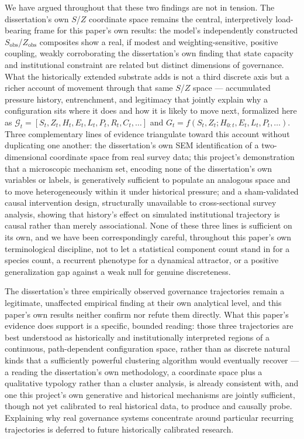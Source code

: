 We have argued throughout that these two findings are not in tension. The
dissertation's own $S$/$Z$ coordinate space remains the central,
interpretively load-bearing frame for this paper's own results: the
model's independently constructed $S_{\text{obs}}$/$Z_{\text{obs}}$
composites show a real, if modest and weighting-sensitive, positive
coupling, weakly corroborating the dissertation's own finding that state
capacity and institutional constraint are related but distinct dimensions
of governance. What the historically extended substrate adds is not a
third discrete axis but a richer account of movement through that same
$S$/$Z$ space --- accumulated pressure history, entrenchment, and
legitimacy that jointly explain why a configuration sits where it does and
how it is likely to move next, formalized here as
$\mathcal{G}_t=[S_t,Z_t,H_t,E_t,L_t,P_t,R_t,C_t,\ldots]$ and
$G_t=f(S_t,Z_t;H_{0:t},E_t,L_t,P_t,\ldots)$. Three complementary lines of
evidence triangulate toward this account without duplicating one another:
the dissertation's own SEM identification of a two-dimensional coordinate
space from real survey data; this project's demonstration that a
microscopic mechanism set, encoding none of the dissertation's own
variables or labels, is generatively sufficient to populate an analogous
space and to move heterogeneously within it under historical pressure; and
a sham-validated causal intervention design, structurally unavailable to
cross-sectional survey analysis, showing that history's effect on
simulated institutional trajectory is causal rather than merely
associational. None of these three lines is sufficient on its own, and we
have been correspondingly careful, throughout this paper's own
terminological discipline, not to let a statistical component count stand
in for a species count, a recurrent phenotype for a dynamical attractor,
or a positive generalization gap against a weak null for genuine
discreteness.

The dissertation's three empirically observed governance trajectories
remain a legitimate, unaffected empirical finding at their own analytical
level, and this paper's own results neither confirm nor refute them
directly. What this paper's evidence does support is a specific,
bounded reading: those three trajectories are best understood as
historically and institutionally interpreted regions of a continuous,
path-dependent configuration space, rather than as discrete natural kinds
that a sufficiently powerful clustering algorithm would eventually recover
--- a reading the dissertation's own methodology, a coordinate space plus a
qualitative typology rather than a cluster analysis, is already consistent
with, and one this project's own generative and historical mechanisms are
jointly sufficient, though not yet calibrated to real historical data, to
produce and causally probe. Explaining why real governance systems
concentrate around particular recurring trajectories is deferred to future
historically calibrated research.
